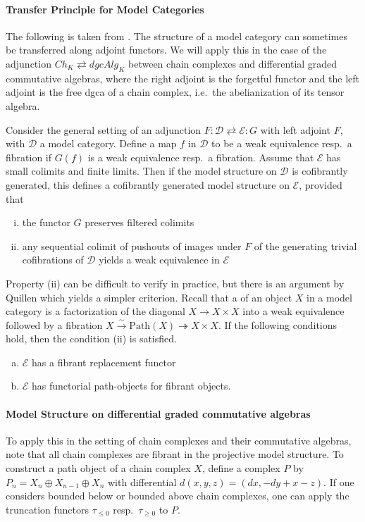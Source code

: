 \documentclass{scrartcl}
\let\emph\relax
\theoremstyle{plain}
\theoremstyle{definition}
\newcommand{\cat}[1]{\mathcal{#1}}
\let\xto\xrightarrow
\newcommand{\surjto}{\twoheadrightarrow}
\begin{document}
\paragraph{Transfer Principle for Model Categories} The following is taken from \cite[2.5 and 2.6]{berger2003axiomatic}. The structure of a model category can sometimes be transferred along adjoint functors. We will apply this in the case of the adjunction $Ch_K \rightleftarrows dgcAlg_K$ between chain complexes and differential graded commutative algebras, where the right adjoint is the forgetful functor and the left adjoint is the free dgca of a chain complex, i.e.\ the abelianization of its tensor algebra. 

Consider the general setting of an adjunction $F\colon \cat D\rightleftarrows \cat E \colon G$ with left adjoint $F$, with $\cat D$ a model category. Define a map $f$ in $\cat D$ to be a weak equivalence resp.\ a fibration if $G(f)$ is a weak equivalence resp.\ a fibration. Assume that $\cat E$ has small colimits and finite limits. Then if the model structure on $\cat D$ is cofibrantly generated, this defines a cofibrantly generated model structure on $\cat E$, provided that
\begin{enumerate}[(i)]
    \item the functor $G$ preserves filtered colimits
    \item any sequential colimit of pushouts of images under $F$ of the generating trivial cofibrations of $\cat D$ yields a weak equivalence in $\cat E$
\end{enumerate}

Property (ii) can be difficult to verify in practice, but there is an argument by Quillen which yields a simpler criterion. Recall that a \emph{path object} of an object $X$ in a model category is a factorization of the diagonal $X\to X\times X$ into a weak equivalence followed by a fibration $X\xto{\sim} \mathrm{Path}(X)\surjto X\times X$. If the following conditions hold, then the condition (ii) is satisfied. 
\begin{enumerate}[(a)]
    \item $\cat E$ has a fibrant replacement functor
    \item $\cat E$ has functorial path-objects for fibrant objects.
\end{enumerate}

\paragraph{Model Structure on differential graded commutative algebras} To apply this in the setting of chain complexes and their commutative algebras, note that all chain complexes are fibrant in the projective model structure. To construct a path object of a chain complex $X$, define a complex $P$ by $P_n = X_n\oplus X_{n-1}\oplus X_n$ with differential $d(x, y, z) = (dx, -dy + x - z)$. If one considers bounded below or bounded above chain complexes, one can apply the truncation functors $\tau_{\leq 0}$ resp.\ $\tau_{\geq 0}$ to $P$.
\end{document}
